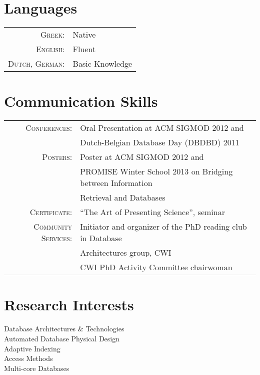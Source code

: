 \documentclass[a4paper,10pt]{article}
\begin{document}
\section{Languages}
\begin{tabular}{rl}
 \textsc{Greek:}&Native\\
\textsc{English:}&Fluent\\
\textsc{Dutch, German:}&Basic Knowledge\\
\end{tabular}

\section{Communication Skills}
\begin{tabular}{rl}
\textsc{Conferences}:& Oral Presentation at ACM SIGMOD 2012 and\\
        &Dutch-Belgian Database Day (DBDBD) 2011\\
\textsc{Posters}:& Poster at ACM SIGMOD 2012 and\\
        &\textsc{PROMISE} Winter School 2013 on Bridging between Information \\
        &Retrieval and Databases\\
\textsc{Certificate}:& ``The Art of Presenting Science'', seminar\\
\textsc{Community Services}:& Initiator and organizer of the PhD reading club in Database\\ 
&Architectures group, CWI\\
 & CWI PhD Activity Committee chairwoman\\
\end{tabular}


\section{Research Interests}
Database Architectures $\&$ Technologies\\
Automated Database Physical Design\\
Adaptive Indexing\\
Access Methods\\
Multi-core Databases\\
\end{document}
